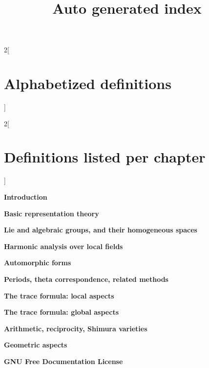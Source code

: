 

\title{Auto generated index}
\maketitle

\label{section-phantom}

\tableofcontents

\frenchspacing


\begin{multicols}{2}[\section{Alphabetized definitions}\label{section-alphabetized}]
\end{multicols}

\begin{multicols}{2}[\section{Definitions listed per chapter}\label{section-per-chapter}]

\medskip\noindent
{\bf Introduction}

\medskip

\medskip\noindent
{\bf Basic representation theory}

\medskip

\medskip\noindent
{\bf Lie and algebraic groups, and their homogeneous spaces}

\medskip

\medskip\noindent
{\bf Harmonic analysis over local fields}

\medskip

\medskip\noindent
{\bf Automorphic forms}

\medskip

\medskip\noindent
{\bf Periods, theta correspondence, related methods}

\medskip

\medskip\noindent
{\bf The trace formula: local aspects}

\medskip

\medskip\noindent
{\bf The trace formula: global aspects}

\medskip

\medskip\noindent
{\bf Arithmetic, reciprocity, Shimura varieties}

\medskip

\medskip\noindent
{\bf Geometric aspects}

\medskip

\medskip\noindent
{\bf GNU Free Documentation License}

\medskip
\end{multicols}




